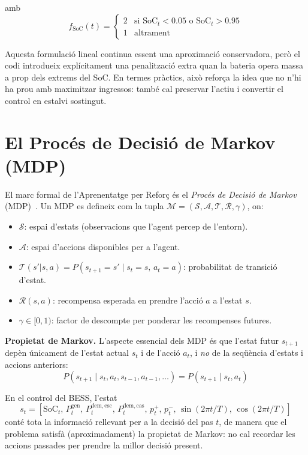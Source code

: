 \documentclass[a4paper,12pt,twoside]{ThesisStyle}
\begin{document}
amb
\begin{equation}
  f_{\mathrm{SoC}}(t) = \begin{cases}
    2 & \text{si } \mathrm{SoC}_t < 0.05 \text{ o } \mathrm{SoC}_t > 0.95 \\
    1 & \text{altrament}
  \end{cases}
\end{equation}

Aquesta formulació lineal continua essent una aproximació conservadora, però el codi introdueix explícitament una penalització extra quan la bateria opera massa a prop dels extrems del SoC. En termes pràctics, això reforça la idea que no n'hi ha prou amb maximitzar ingressos: també cal preservar l'actiu i convertir el control en estalvi sostingut.

\section{El Procés de Decisió de Markov (MDP)}

El marc formal de l'Aprenentatge per Reforç és el \textit{Procés de Decisió de Markov} (MDP)~\cite{sutton2018rl}. Un MDP es defineix com la tupla $\mathcal{M} = (\mathcal{S}, \mathcal{A}, \mathcal{T}, \mathcal{R}, \gamma)$, on:
\begin{itemize}
    \item $\mathcal{S}$: espai d'estats (observacions que l'agent percep de l'entorn).
    \item $\mathcal{A}$: espai d'accions disponibles per a l'agent.
    \item $\mathcal{T}(s'|s,a) = P(s_{t+1}=s' \mid s_t=s,\, a_t=a)$: probabilitat de transició d'estat.
    \item $\mathcal{R}(s,a)$: recompensa esperada en prendre l'acció $a$ a l'estat $s$.
    \item $\gamma \in [0,1)$: factor de descompte per ponderar les recompenses futures.
\end{itemize}

\textbf{Propietat de Markov.} L'aspecte essencial dels MDP és que l'estat futur $s_{t+1}$ depèn únicament de l'estat actual $s_t$ i de l'acció $a_t$, i \textit{no} de la seqüència d'estats i accions anteriors:
\begin{equation}
    P(s_{t+1} \mid s_t, a_t, s_{t-1}, a_{t-1}, \ldots) = P(s_{t+1} \mid s_t, a_t)
    \label{eq:markov}
\end{equation}

En el control del BESS, l'estat
\[
  s_t = [\mathrm{SoC}_t,\, P_t^{\mathrm{gen}},\, P_t^{\mathrm{dem,esc}},\, P_t^{\mathrm{dem,cas}},\, p_t^{+},\, p_t^{-},\, \sin(2\pi t/T),\, \cos(2\pi t/T)]
\]
conté tota la informació rellevant per a la decisió del pas $t$, de manera que el problema satisfà (aproximadament) la propietat de Markov: no cal recordar les accions passades per prendre la millor decisió present.
\end{document}

